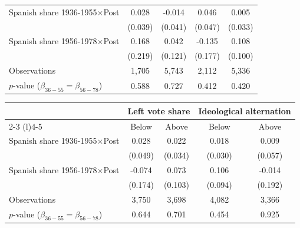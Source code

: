 \begin{table}[!h]
\begin{tabular*}{\textwidth}{l@{\extracolsep{\fill}}cccc}
Spanish share 1936-1955$\times$Post & 0.028 & -0.014 & 0.046 & 0.005 \\
 & (0.039) & (0.041) & (0.047) & (0.033) \\
Spanish share 1956-1978$\times$Post & 0.168 & 0.042 & -0.135 & 0.108 \\
  & (0.219) & (0.121) & (0.177) & (0.100) \\
\addlinespace
Observations & 1,705 & 5,743 & 2,112 & 5,336 \\
$p$-value ($\beta_{36{-}55} = \beta_{56{-}78}$) & 0.588 & 0.727 & 0.412 & 0.420 \\
\hline
\end{tabular*}
\begin{tabular*}{\textwidth}{l@{\extracolsep{\fill}}cccc}
& \multicolumn{2}{c}{Left vote share} & \multicolumn{2}{c}{Ideological alternation} \\
\cmidrule(l){2-3} \cmidrule(l){4-5}
& Below & Above & Below & Above \\
\hline
Spanish share 1936-1955$\times$Post & 0.028 & 0.022 & 0.018 & 0.009 \\
 & (0.049) & (0.034) & (0.030) & (0.057) \\
Spanish share 1956-1978$\times$Post & -0.074 & 0.073 & 0.106 & -0.014 \\
  & (0.174) & (0.103) & (0.094) & (0.192) \\
\addlinespace
Observations & 3,750 & 3,698 & 4,082 & 3,366 \\
$p$-value ($\beta_{36{-}55} = \beta_{56{-}78}$) & 0.644 & 0.701 & 0.454 & 0.925 \\
\hline
\end{tabular*}
\addvspace{0.2em}
\captionsetup{font=footnotesize, justification=justified, singlelinecheck=false}

\end{table}
